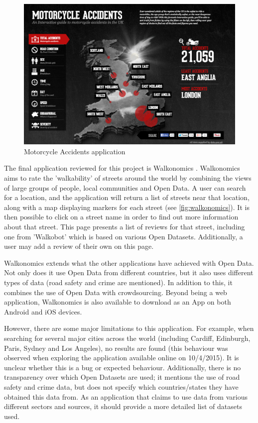 \documentclass[authoryearcitations]{UoYCSproject}
\begin{document}
\begin{figure}
	\center
	\includegraphics[scale=0.3]{motorcycle}
	\caption{Motorcycle Accidents application}
	\label{fig:motorcycle}
\end{figure}

The final application reviewed for this project is Walkonomics \citep{Davies}. Walkonomics aims to rate the 'walkability' of streets around the world by combining the views of large groups of people, local communities and Open Data. A user can search for a location, and the application will return a list of streets near that location, along with a map displaying markers for each street (see \autoref{fig:walkonomics}). It is then possible to click on a street name in order to find out more information about that street. This page presents a list of reviews for that street, including one from 'Walkobot' which is based on various Open Datasets. Additionally, a user may add a review of their own on this page. 

Walkonomics extends what the other applications have achieved with Open Data. Not only does it use Open Data from different countries, but it also uses different types of data (road safety and crime are mentioned). In addition to this, it combines the use of Open Data with crowdsourcing. Beyond being a web application, Walkonomics is also available to download as an App on both Android and iOS devices.

However, there are some major limitations to this application. For example, when searching for several major cities across the world (including Cardiff, Edinburgh, Paris, Sydney and Los Angeles), no results are found (this behaviour was observed when exploring the application available online on 10/4/2015). It is unclear whether this is a bug or expected behaviour. Additionally, there is no transparency over which Open Datasets are used; it mentions the use of road safety and crime data, but does not specify which countries/states they have obtained this data from. As an application that claims to use data from various different sectors and sources, it should provide a more detailed list of datasets used.
\end{document}
